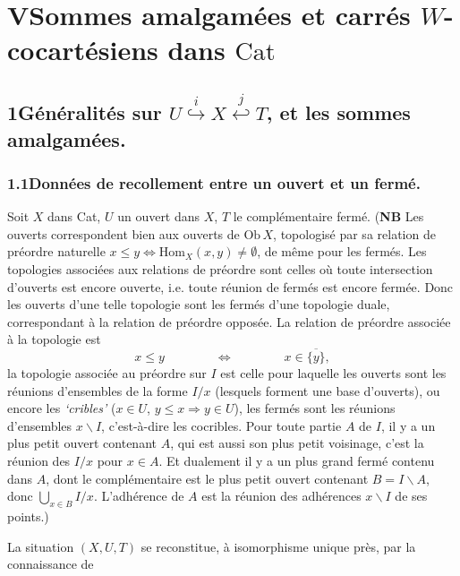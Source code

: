 \documentclass[11pt]{article}
\newcommand{\printedpage}[1]{\marginpar{\footnotesize p.~#1}}
\newcommand{\msp}[1]{\marginpar{\footnotesize [#1]}}
\begin{document}
\printedpage{43}

\msp{page 59}

\section*{V\quad Sommes amalgamées et carrés $W$-cocartésiens dans $\mathrm{Cat}$}

\subsection*{1\quad Généralités sur $U \overset{i}{\hookrightarrow} X \overset{j}{\hookleftarrow} T$, et les sommes amalgamées.}

\subsubsection*{1.1\quad Données de recollement entre un ouvert et un fermé.}

Soit $X$ dans Cat, $U$ un ouvert dans $X$, $T$ le complémentaire fermé. (\textbf{NB} Les ouverts correspondent bien aux ouverts de $\mathrm{Ob}\,X$, topologisé par sa relation de préordre naturelle $x \leq y \iff \mathrm{Hom}_X(x,y) \neq \emptyset$, de même pour les fermés. Les topologies associées aux relations de préordre sont celles où toute intersection d'ouverts est encore ouverte, i.e. toute réunion de fermés est encore fermée. Donc les ouverts d'une telle topologie sont les fermés d'une topologie duale, correspondant à la relation de préordre opposée. La relation de préordre associée à la topologie est
\[
x \leq y \qquad\qquad \iff \qquad\qquad x \in \overline{\{y\}},
\]
la topologie associée au préordre sur $I$ est celle pour laquelle les ouverts sont les réunions d'ensembles de la forme $I/x$ (lesquels forment une base d'ouverts), ou encore les \textit{`cribles'} ($x \in U$, $y \leq x \Longrightarrow y \in U$), les fermés sont les réunions d'ensembles $x\backslash I$, c'est-à-dire les cocribles. Pour toute partie $A$ de $I$, il y a un plus petit ouvert contenant $A$, qui est aussi son plus petit voisinage, c'est la réunion des $I/x$ pour $x \in A$. Et dualement il y a un plus grand fermé contenu dans $A$, dont le complémentaire est le plus petit ouvert contenant $B = I\backslash A$, donc $\bigcup_{x\in B} I/x$. L'adhérence de $A$ est la réunion des adhérences $x\backslash I$ de ses points.)

\msp{page 60}

La situation $(X,U,T)$ se reconstitue, à isomorphisme unique près, par la connaissance de
\end{document}
